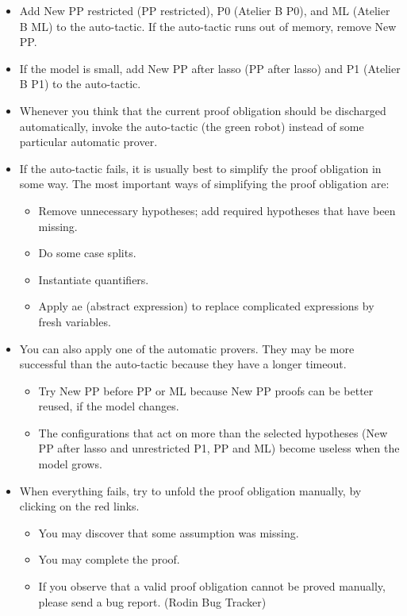 \begin{itemize}
	\item Add New PP restricted (PP restricted), P0 (Atelier B P0), and ML (Atelier B ML) to the auto-tactic. If the auto-tactic runs out of memory, remove New PP.
	\item If the model is small, add New PP after lasso (PP after lasso) and P1 (Atelier B P1) to the auto-tactic.
	\item Whenever you think that the current proof obligation should be discharged automatically, invoke the auto-tactic (the green robot) instead of some particular automatic prover.
	\item If the auto-tactic fails, it is usually best to simplify the proof obligation in some way. The most important ways of simplifying the proof obligation are:
	\begin{itemize}
		\item Remove unnecessary hypotheses; add required hypotheses that have been missing.
		\item Do some case splits.
		\item Instantiate quantifiers.
		\item Apply ae (abstract expression) to replace complicated expressions by fresh variables. 
	\end{itemize}
	\item You can also apply one of the automatic provers. They may be more successful than the auto-tactic because they have a longer timeout.
	\begin{itemize}
		\item Try New PP before PP or ML because New PP proofs can be better reused, if the model changes.
		\item The configurations that act on more than the selected hypotheses (New PP after lasso and unrestricted P1, PP and ML) become useless when the model grows. 
	\end{itemize}
	\item When everything fails, try to unfold the proof obligation manually, by clicking on the red links.
	\begin{itemize}
		\item You may discover that some assumption was missing.
		\item You may complete the proof.
		\item If you observe that a valid proof obligation cannot be proved manually, please send a bug report. (Rodin Bug Tracker) 
	\end{itemize}
\end{itemize}


